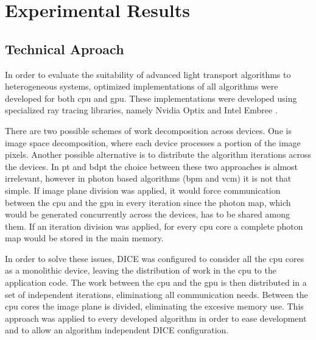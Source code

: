 \chapter{Experimental Results}

\section{Technical Aproach}

In order to evaluate the suitability of advanced light transport algorithms to heterogeneous systems, optimized implementations of all algorithms were developed for both \gls{cpu} and \gls{gpu}. These implementations were developed using specialized ray tracing libraries, namely Nvidia Optix \citep{parker2010optix} and Intel Embree \citep{wald2014embree}.


There are two possible schemes of work decomposition across devices. One is image space decomposition, where each device processes a portion of the image pixels. Another possible alternative is to distribute the algorithm iterations across the devices. In \gls{pt} and \gls{bdpt} the choice between these two approaches is almost irrelevant, however in photon based algorithms (\gls{bpm} and \gls{vcm}) it is not that simple. If image plane division was applied, it would force communication between the \gls{cpu} and the \gls{gpu} in every iteration since the photon map, which would be generated concurrently across the devices, has to be shared among them. If an iteration division was applied, for every \gls{cpu} core a complete photon map would be stored in the main memory.

In order to solve these issues, DICE was configured to consider all the \gls{cpu} cores as a monolithic device, leaving the distribution of work in the \gls{cpu} to the application code. The work between the \gls{cpu} and the \gls{gpu} is then distributed in a set of independent iterations, eliminationg all communication needs. Between the \gls{cpu} cores the image plane is divided, eliminating the excesive memory use. This approach was applied to every developed algorithm in order to ease development and to allow an algorithm independent DICE configuration.

